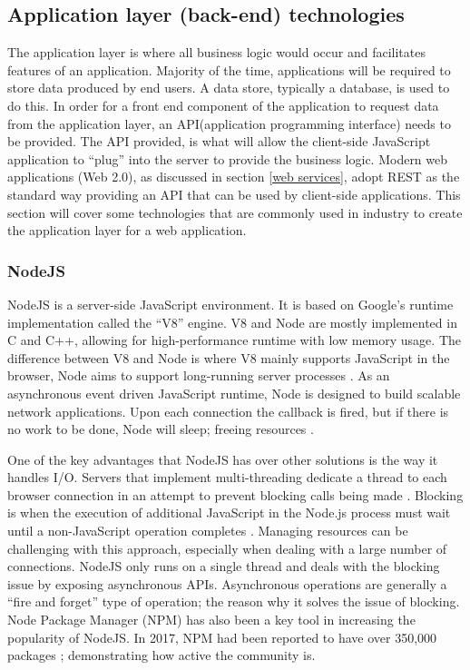\subsection{Application layer (back-end) technologies}
The application layer is where all business logic would occur and facilitates features of an application.
Majority of the time, applications will be required to store data produced by end users. A data store, typically a database, is
used to do this.
In order for a front end component of the application to request data from the application layer, an API(application programming interface) needs
to be provided. The API provided, is what will allow the client-side JavaScript application to ``plug'' into the server to provide the business
logic. 
Modern web applications (Web 2.0), as discussed in section \ref{web services}, adopt REST as the standard way providing an API that can be used
by client-side applications.
This section will cover some technologies that are commonly used in industry to create the application layer for a web application.

\subsubsection{NodeJS}
NodeJS is a server-side JavaScript environment. It is based on Google's runtime implementation called the ``V8'' engine.
V8 and Node are mostly implemented in C and C++, allowing for high-performance runtime with low memory usage.
The difference between V8 and Node is where V8 mainly supports JavaScript in the browser, Node aims to support long-running 
server processes \cite{tilkov2010node}.
As an asynchronous event driven JavaScript runtime, Node is designed to build scalable network applications. 
Upon each connection the callback is fired, but if there is no work to be done, Node will sleep; freeing resources \cite{nodejs2016}.

One of the key advantages that NodeJS has over other solutions is the way it handles I/O.
Servers that implement multi-threading dedicate a thread to each browser connection in an attempt to prevent blocking calls being made \cite{frees2015place}.
Blocking is when the execution of additional JavaScript in the Node.js process must wait until a non-JavaScript operation completes \cite{nodejs2019blocking}. 
Managing resources can be challenging with this approach, especially when dealing with a large number of connections.
NodeJS only runs on a single thread and deals with the blocking issue by exposing asynchronous APIs.
Asynchronous operations are generally a ``fire and forget'' type of operation; the reason why it solves the issue of blocking.
Node Package Manager (NPM) has also been a key tool in increasing the popularity of NodeJS.
In 2017, NPM had been reported to have over 350,000 packages \cite{linux2016stateofnpm}; demonstrating how active the community is.

